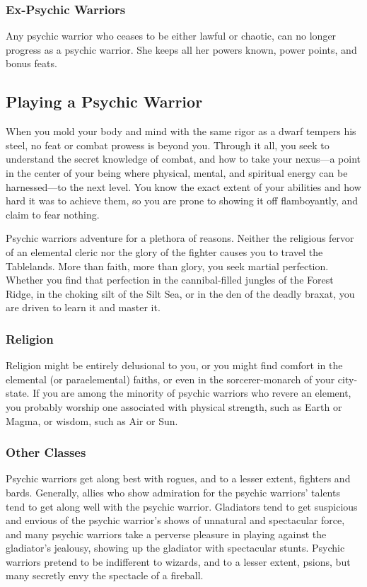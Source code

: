 \subsubsection{Ex-Psychic Warriors}
Any psychic warrior who ceases to be either lawful or chaotic, can no longer progress as a psychic warrior. She keeps all her powers known, power points, and bonus feats.

\vskip2cm
\subsection{Playing a Psychic Warrior}
When you mold your body and mind with the same rigor as a dwarf tempers his steel, no feat or combat prowess is beyond you. Through it all, you seek to understand the secret knowledge of combat, and how to take your nexus---a point in the center of your being where physical, mental, and spiritual energy can be harnessed---to the next level. You know the exact extent of your abilities and how hard it was to achieve them, so you are prone to showing it off flamboyantly, and claim to fear nothing.

Psychic warriors adventure for a plethora of reasons. Neither the religious fervor of an elemental cleric nor the glory of the fighter causes you to travel the Tablelands. More than faith, more than glory, you seek martial perfection. Whether you find that perfection in the cannibal-filled jungles of the Forest Ridge, in the choking silt of the Silt Sea, or in the den of the deadly braxat, you are driven to learn it and master it.

\subsubsection{Religion}
Religion might be entirely delusional to you, or you might find comfort in the elemental (or paraelemental) faiths, or even in the sorcerer-monarch of your city-state. If you are among the minority of psychic warriors who revere an element, you probably worship one associated with physical strength, such as Earth or Magma, or wisdom, such as Air or Sun.

\subsubsection{Other Classes}
Psychic warriors get along best with rogues, and to a lesser extent, fighters and bards. Generally, allies who show admiration for the psychic warriors' talents tend to get along well with the psychic warrior. Gladiators tend to get suspicious and envious of the psychic warrior's shows of unnatural and spectacular force, and many psychic warriors take a perverse pleasure in playing against the gladiator's jealousy, showing up the gladiator with spectacular stunts. Psychic warriors pretend to be indifferent to wizards, and to a lesser extent, psions, but many secretly envy the spectacle of a fireball.

